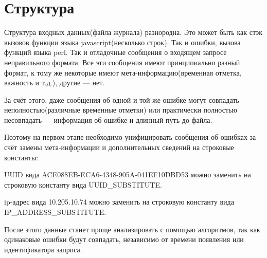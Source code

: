 \section{Структура}
Структура входных данных(файла журнала) разнородна. Это может быть как стэк
вызовов функции языка javascript(несколько строк). Так и ошибки, вызова
функций языка perl. Так и отладочные сообщения о входящем запросе неправильного
формата. Все эти сообщения имеют принципиально разный формат, к тому же
некоторые имеют мета-информацию(временная отметка, важность и т.д.),
другие --- нет.

За счёт этого, даже сообщения об одной и той же ошибке могут совпадать
неполностью(различные временные отметки) или практически полностью несовпадать
--- информация об ошибке и длинный путь до файла.

Поэтому на первом этапе необходимо унифицировать сообщения об ошибках за счёт
замены мета-информации и дополнительных сведений на строковые константы:

\begin{example}
UUID вида ACE088EB-ECA6-4348-905A-041EF10DBD53 можно заменить на строковую
константу вида UUID\_SUBSTITUTE.
\end{example}

\begin{example}
ip-адрес вида 10.205.10.74 можно заменить на строковую
константу вида IP\_ADDRESS\_SUBSTITUTE.
\end{example}

После этого данные станет проще анализировать с помощью алгоритмов,
так как одинаковые ошибки будут совпадать, независимо от времени появления или
идентификатора запроса.

